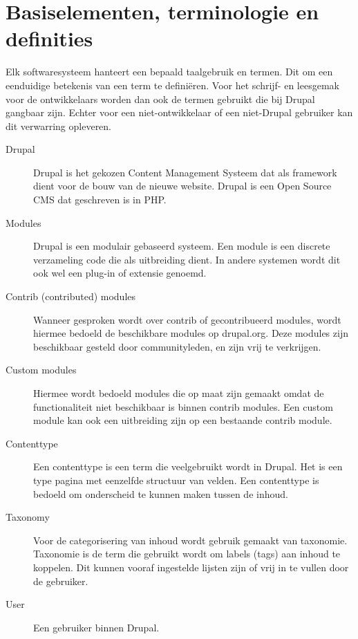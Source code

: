 \section{Basiselementen, terminologie en definities}

Elk softwaresysteem hanteert een bepaald taalgebruik en termen. Dit om een eenduidige betekenis van een term te defini\"eren. Voor het schrijf- en leesgemak voor de ontwikkelaars worden dan ook de termen gebruikt die bij Drupal gangbaar zijn. Echter voor een niet-ontwikkelaar of een niet-Drupal gebruiker kan dit verwarring opleveren. 

\begin{description}

\item[Drupal] Drupal is het gekozen Content Management Systeem dat als framework dient voor de bouw van de nieuwe website. Drupal is een Open Source CMS dat geschreven is in PHP. 

\item[Modules] Drupal is een modulair gebaseerd systeem. Een module is een discrete verzameling code die als uitbreiding dient. In andere systemen wordt dit ook wel een plug-in of extensie genoemd. 

\item[Contrib (contributed) modules] Wanneer gesproken wordt over contrib of gecontribueerd modules, wordt hiermee bedoeld de beschikbare modules op drupal.org. Deze modules zijn beschikbaar gesteld door communityleden, en zijn vrij te verkrijgen. 

\item[Custom modules] Hiermee wordt bedoeld modules die op maat zijn gemaakt omdat de functionaliteit niet beschikbaar is binnen contrib modules. Een custom module kan ook een uitbreiding zijn op een bestaande contrib module. 

\item[Contenttype] Een contenttype is een term die veelgebruikt wordt in Drupal. Het is een type pagina met eenzelfde structuur van velden. Een contenttype is bedoeld om onderscheid te kunnen maken tussen de inhoud. 

\item[Taxonomy] Voor de categorisering van inhoud wordt gebruik gemaakt van taxonomie. Taxonomie is de term die gebruikt wordt om labels (tags) aan inhoud te koppelen. Dit kunnen vooraf ingestelde lijsten zijn of vrij in te vullen door de gebruiker. 

\item[User] Een gebruiker binnen Drupal.


\end{description}
